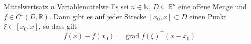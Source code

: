 \begin{Lemma}{Mittelwertsatz $n$ Variable}{mittelwe}
    Es sei $n\in\mathbb{N}$, $D\subseteq\mathbb{R}^n$ eine offene Menge und $f\in C^{1}(D,\mathbb{R})$. Dann gibt es auf jeder Strecke $[x_0,x]\subset D$ einen Punkt $\xi\in[x_0,x]$, so dass gilt
    \begin{equation*}
        f(x)-f(x_0) = \operatorname{grad} f(\xi)^{\top}(x-x_0)
    \end{equation*}
\end{Lemma}
%
\endinput 